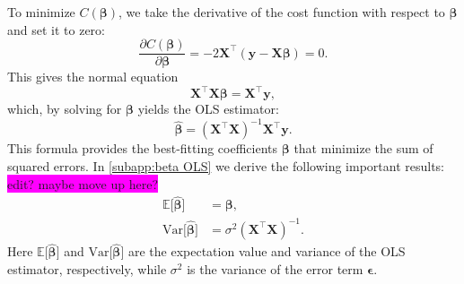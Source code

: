 \documentclass[aps,pra,english,notitlepage,reprint,nofootinbib]{revtex4-1}  %
\begin{document}
To minimize $C(\boldsymbol{\beta})$, we take the derivative of the cost function with respect to $\boldsymbol{\beta}$ and set it to zero:
\begin{equation}
\frac{\partial C(\boldsymbol{\beta})}{\partial \boldsymbol{\beta}} = -2 \mathbf{X}^\top (\mathbf{y} - \mathbf{X} \boldsymbol{\beta}) = 0.
\end{equation}
This gives the normal equation
\begin{equation}
\mathbf{X}^\top \mathbf{X} \boldsymbol{\beta} = \mathbf{X}^\top \mathbf{y},
\end{equation}
which, by solving for $\boldsymbol{\beta}$ yields the OLS estimator:
\begin{equation}
\boldsymbol{\hat{\beta}} = (\mathbf{X}^\top \mathbf{X})^{-1} \mathbf{X}^\top \mathbf{y}.
\end{equation}
This formula provides the best-fitting coefficients $\boldsymbol{\beta}$ that minimize the sum of squared errors. In \cref{subapp:beta OLS} we derive the following important results: \colorbox{magenta}{edit? maybe move up here?}
\begin{align}
  \mathbb{E}\big[\hat{\boldsymbol{\beta}}\big] &= \boldsymbol{\beta},
  \\
  \text{Var}\big[\hat{\boldsymbol{\beta}}\big] &= \sigma^2\left(\mathbf{X}^\top\mathbf{X}\right)^{-1}.
\end{align}
Here $\mathbb{E}\big[\hat{\boldsymbol{\beta}}\big]$ and $\text{Var}\big[\hat{\boldsymbol{\beta}}\big]$ are the expectation value and variance of the OLS estimator, respectively, while $\sigma^2$ is the variance of the error term $\boldsymbol{\epsilon}$. 

\end{document}
